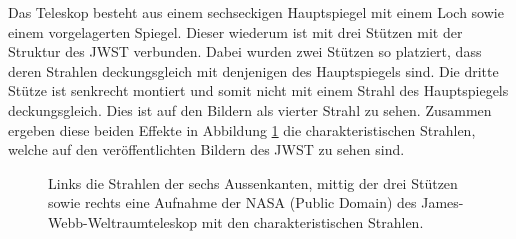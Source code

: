 Das Teleskop besteht aus einem sechseckigen Hauptspiegel mit einem Loch sowie einem vorgelagerten Spiegel.
Dieser wiederum ist mit drei Stützen mit der Struktur des JWST verbunden.
Dabei wurden zwei Stützen so platziert, dass deren Strahlen deckungsgleich mit denjenigen des Hauptspiegels sind.
Die dritte Stütze ist senkrecht montiert und somit nicht mit einem Strahl des Hauptspiegels deckungsgleich.
Dies ist auf den Bildern als vierter Strahl zu sehen.
Zusammen ergeben diese beiden Effekte in Abbildung \ref{opt:fig:jwst} die charakteristischen Strahlen, welche auf
den veröffentlichten Bildern des JWST zu sehen sind.

\begin{figure}
    \centering

    \hfill
    \hfill
    \caption{Links die Strahlen der sechs Aussenkanten, mittig der drei Stützen sowie rechts eine Aufnahme der NASA (Public Domain)
        des James-Webb-Weltraumteleskop mit den charakteristischen Strahlen.}
    \label{opt:fig:jwst}
\end{figure}
